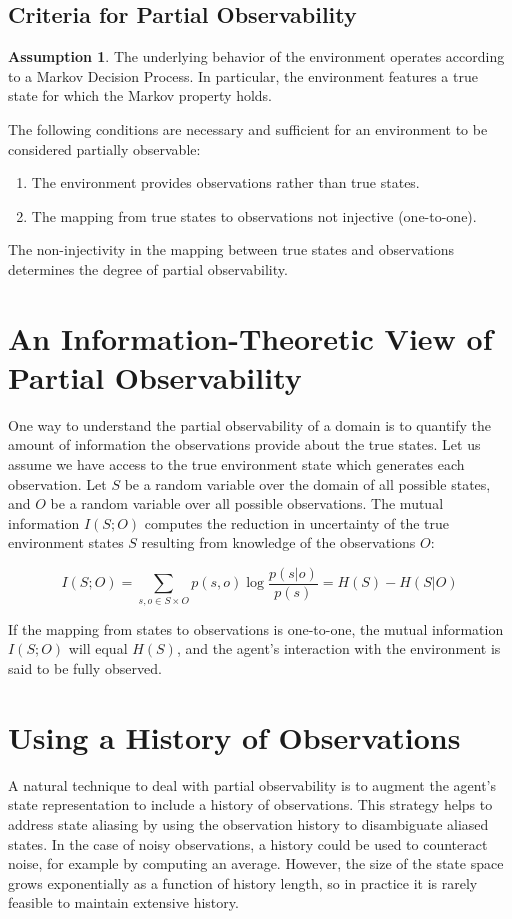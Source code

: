 \documentclass{article} %
\theoremstyle{definition}
\newtheorem{assumption}{Assumption}
\begin{document}
\subsection{Criteria for Partial Observability}
\begin{assumption}
The underlying behavior of the environment operates according to a
Markov Decision Process. In particular, the environment features a
true state for which the Markov property holds.
\end{assumption}

The following conditions are necessary and sufficient for an
environment to be considered partially observable:

\begin{enumerate}
\item The environment provides observations rather than true states.
\item The mapping from true states to observations not injective (one-to-one).
\end{enumerate}

The non-injectivity in the mapping between true states and
observations determines the degree of partial observability.

\section{An Information-Theoretic View of Partial Observability}
One way to understand the partial observability of a domain is to
quantify the amount of information the observations provide about the
true states. Let us assume we have access to the true environment
state which generates each observation. Let $S$ be a random variable
over the domain of all possible states, and $O$ be a random variable
over all possible observations. The mutual information $I(S;O)$
computes the reduction in uncertainty of the true environment states
$S$ resulting from knowledge of the observations $O$:

\[
I(S;O) = \sum_{s,o \in S \times O} p(s,o) \log \frac{p(s|o)}{p(s)} = H(S) - H(S|O)
\]

If the mapping from states to observations is one-to-one, the mutual
information $I(S;O)$ will equal $H(S)$, and the agent's interaction
with the environment is said to be fully observed.

\section{Using a History of Observations}
A natural technique to deal with partial observability is to augment
the agent's state representation to include a history of
observations. This strategy helps to address state aliasing by using
the observation history to disambiguate aliased states. In the case of
noisy observations, a history could be used to counteract noise, for
example by computing an average. However, the size of the state space
grows exponentially as a function of history length, so in practice it
is rarely feasible to maintain extensive history.
\end{document}

